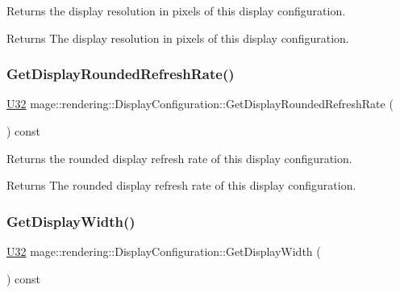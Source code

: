 Returns the display resolution in pixels of this display configuration.

\begin{DoxyReturn}{Returns}
The display resolution in pixels of this display configuration. 
\end{DoxyReturn}
\mbox{\label{classmage_1_1rendering_1_1_display_configuration_a6650e981bf82c85d5339afbc37cee64a}} 
\subsubsection{\texorpdfstring{Get\+Display\+Rounded\+Refresh\+Rate()}{GetDisplayRoundedRefreshRate()}}
{\footnotesize\ttfamily \mbox{\hyperlink{namespacemage_a41c104c036fba3756a74e19f793eeaa1}{U32}} mage\+::rendering\+::\+Display\+Configuration\+::\+Get\+Display\+Rounded\+Refresh\+Rate (\begin{DoxyParamCaption}{ }\end{DoxyParamCaption}) const\hspace{0.3cm}{\ttfamily [noexcept]}}

Returns the rounded display refresh rate of this display configuration.

\begin{DoxyReturn}{Returns}
The rounded display refresh rate of this display configuration. 
\end{DoxyReturn}
\mbox{\label{classmage_1_1rendering_1_1_display_configuration_a4ceed88b5f46a87857cf0b2979badf46}} 
\subsubsection{\texorpdfstring{Get\+Display\+Width()}{GetDisplayWidth()}}
{\footnotesize\ttfamily \mbox{\hyperlink{namespacemage_a41c104c036fba3756a74e19f793eeaa1}{U32}} mage\+::rendering\+::\+Display\+Configuration\+::\+Get\+Display\+Width (\begin{DoxyParamCaption}{ }\end{DoxyParamCaption}) const\hspace{0.3cm}{\ttfamily [noexcept]}}

